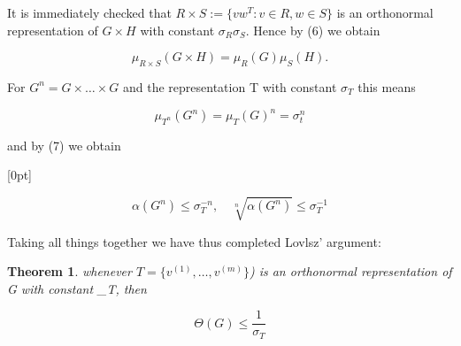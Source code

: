 \documentclass[openany,12pt]{memoir}
\newtheorem{thm}{Theorem}
\begin{document}
It is immediately checked that $R \times S := \{vw^T : v \in R, w \in S\}$ is an
orthonormal representation of $G \times H$ with constant $\sigma_R \sigma_S$. Hence by (6) 
we obtain 

\[
\mu_{R \times S}(G \times H) = \mu_{R}(G)\mu_{S}(H).
\]

For $G^n = G \times \ldots \times G$ and the representation T with constant $\sigma_T$ this
means 

\[
\mu_{T^n}(G^n) = \mu_{T}(G)^n = \sigma_{t}^n
\]

and by (7) we obtain

[0pt]

\[
\alpha(G^n) \leq \sigma_{T}^{-n},  \quad   \sqrt[n]{\alpha(G^n)} \leq \sigma_{T}^{-1}
\]

Taking all things together we have thus completed Lovlsz' argument: 


\begin{thm}\label{theorem}
whenever $T = \{v^{(1)}, \ldots, v^{(m)}\}$) is an orthonormal 
representation of G with constant \sigma_T, then

\begin{equation}
    \Theta(G) \leq {\frac{1}{\sigma_T}}  \label{eight}
\end{equation}

\end{thm}
\end{document}
